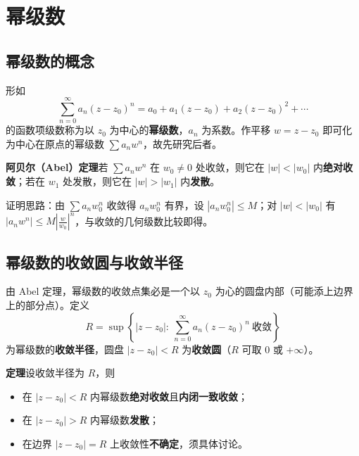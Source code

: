 
\section{幂级数}

\subsection{幂级数的概念}
形如
\[
\sum_{n=0}^{\infty}a_{n}(z-z_{0})^{n}=a_{0}+a_{1}(z-z_{0})+a_{2}(z-z_{0})^{2}+\cdots
\]
的函数项级数称为以 \(z_{0}\) 为中心的\textbf{幂级数}，\(a_{n}\) 为系数。作平移 \(w=z-z_{0}\) 即可化为中心在原点的幂级数 \(\sum a_{n}w^{n}\)，故先研究后者。

\textbf{阿贝尔（Abel）定理}\quad 若 \(\sum a_{n}w^{n}\) 在 \(w_{0}\neq 0\) 处收敛，则它在 \(|w|<|w_{0}|\) 内\textbf{绝对收敛}；若在 \(w_{1}\) 处发散，则它在 \(|w|>|w_{1}|\) 内\textbf{发散}。

证明思路：由 \(\sum a_{n}w_{0}^{n}\) 收敛得 \(a_{n}w_{0}^{n}\) 有界，设 \(|a_{n}w_{0}^{n}|\leqslant M\)；对 \(|w|<|w_{0}|\) 有 \(|a_{n}w^{n}|\leqslant M\left|\frac{w}{w_{0}}\right|^{n}\)，与收敛的几何级数比较即得。

\subsection{幂级数的收敛圆与收敛半径}
由 Abel 定理，幂级数的收敛点集必是一个以 \(z_{0}\) 为心的圆盘内部（可能添上边界上的部分点）。定义
\[
R=\sup\left\{|z-z_{0}|:\ \sum_{n=0}^{\infty}a_{n}(z-z_{0})^{n}\ \text{收敛}\right\}
\]
为幂级数的\textbf{收敛半径}，圆盘 \(|z-z_{0}|<R\) 为\textbf{收敛圆}（\(R\) 可取 \(0\) 或 \(+\infty\)）。

\textbf{定理}\quad 设收敛半径为 \(R\)，则
\begin{itemize}[leftmargin=2em]
  \item 在 \(|z-z_{0}|<R\) 内幂级数\textbf{绝对收敛}且\textbf{内闭一致收敛}；
  \item 在 \(|z-z_{0}|>R\) 内幂级数\textbf{发散}；
  \item 在边界 \(|z-z_{0}|=R\) 上收敛性\textbf{不确定}，须具体讨论。
\end{itemize}

